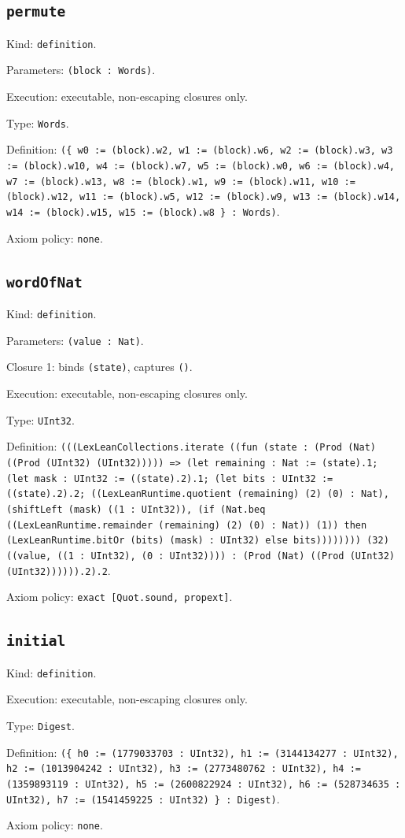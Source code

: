 \documentclass[11pt]{article}
\begin{document}
\subsection*{\texttt{permute}}
\noindent Kind: \texttt{definition}.\par
\noindent Parameters: \texttt{(block : Words)}.\par
\noindent Execution: executable, non-escaping closures only.\par
\noindent Type: \texttt{Words}.\par
\noindent Definition: \texttt{(\{ w0 := (block).w2, w1 := (block).w6, w2 := (block).w3, w3 := (block).w10, w4 := (block).w7, w5 := (block).w0, w6 := (block).w4, w7 := (block).w13, w8 := (block).w1, w9 := (block).w11, w10 := (block).w12, w11 := (block).w5, w12 := (block).w9, w13 := (block).w14, w14 := (block).w15, w15 := (block).w8 \} : Words)}.\par
\noindent Axiom policy: \texttt{none}.\par
\subsection*{\texttt{wordOfNat}}
\noindent Kind: \texttt{definition}.\par
\noindent Parameters: \texttt{(value : Nat)}.\par
\noindent Closure 1: binds \texttt{(state)}, captures \texttt{()}.\par
\noindent Execution: executable, non-escaping closures only.\par
\noindent Type: \texttt{UInt32}.\par
\noindent Definition: \texttt{(((LexLeanCollections.iterate ((fun (state : (Prod (Nat) ((Prod (UInt32) (UInt32))))) => (let remaining : Nat := (state).1; (let mask : UInt32 := ((state).2).1; (let bits : UInt32 := ((state).2).2; ((LexLeanRuntime.quotient (remaining) (2) (0) : Nat), (shiftLeft (mask) ((1 : UInt32)), (if (Nat.beq ((LexLeanRuntime.remainder (remaining) (2) (0) : Nat)) (1)) then (LexLeanRuntime.bitOr (bits) (mask) : UInt32) else bits)))))))) (32) ((value, ((1 : UInt32), (0 : UInt32)))) : (Prod (Nat) ((Prod (UInt32) (UInt32)))))).2).2}.\par
\noindent Axiom policy: \texttt{exact [Quot.sound, propext]}.\par
\subsection*{\texttt{initial}}
\noindent Kind: \texttt{definition}.\par
\noindent Execution: executable, non-escaping closures only.\par
\noindent Type: \texttt{Digest}.\par
\noindent Definition: \texttt{(\{ h0 := (1779033703 : UInt32), h1 := (3144134277 : UInt32), h2 := (1013904242 : UInt32), h3 := (2773480762 : UInt32), h4 := (1359893119 : UInt32), h5 := (2600822924 : UInt32), h6 := (528734635 : UInt32), h7 := (1541459225 : UInt32) \} : Digest)}.\par
\noindent Axiom policy: \texttt{none}.\par
\end{document}
